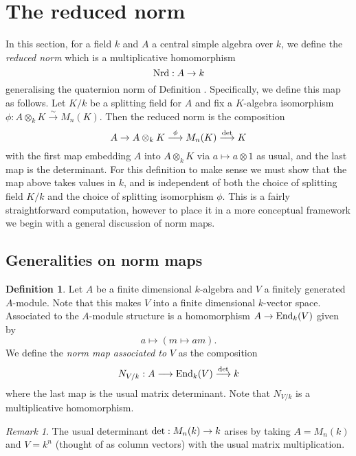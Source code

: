 \documentclass[11pt]{amsart}
\numberwithin{equation}{section}
\theoremstyle{remark}
\newtheorem{remark}[equation]{Remark}
\theoremstyle{remark}
\theoremstyle{remark}
\theoremstyle{definition}
\theoremstyle{definition}
\theoremstyle{definition}
\newtheorem{defi}[equation]{Definition}
\theoremstyle{definition}
\theoremstyle{definition}
\theoremstyle{definition}
\begin{document}
\section{The reduced norm}

In this section, for a field $k$ and $A$ a central simple algebra over $k$, we define the \textit{reduced norm} which is a multiplicative homomorphism
\[\textup{Nrd}:A\rightarrow k\]
generalising the quaternion norm of Definition . Specifically, we define this map as follows. Let $K/k$ be a splitting field for $A$ and fix a $K$-algebra isomorphism
$\phi:A\otimes_k K \stackrel{\sim}{\longrightarrow}M_n(K).$
Then the reduced norm is the composition 
\[A\rightarrow A\otimes_kK \stackrel{\phi}{\longrightarrow}M_n(K)\stackrel{\textup{det}}{\longrightarrow}K\]
with the first map embedding $A$ into $A\otimes_k K$ via $a\mapsto a\otimes 1$ as usual, and the last map is the determinant. For this definition to make sense we must show that the map above takes values in $k$, and is independent of both the choice of splitting field $K/k$ and the choice of splitting isomorphism $\phi$. This is a fairly straightforward computation, however to place it in a more conceptual framework we begin with a general discussion of norm maps. 

\subsection{Generalities on norm maps}

\begin{defi}
Let $A$ be a finite dimensional $k$-algebra and $V$ a finitely generated $A$-module. Note that this makes $V$ into a finite dimensional $k$-vector space. Associated to the $A$-module structure is a homomorphism $A\rightarrow \textup{End}_k(V)$ given by
\[a\mapsto (m\mapsto am).\]
We define the \textit{norm map associated to} $V$ as the composition
\[N_{V/k}:A\longrightarrow \textup{End}_k(V)\stackrel{\textup{det}}{\longrightarrow}k\]
where the last map is the usual matrix determinant. Note that $N_{V/k}$ is a multiplicative homomorphism. 
\end{defi}

\begin{remark} \label{usual determinant}
The usual determinant $\textup{det}:M_n(k)\rightarrow k$ arises by taking $A=M_n(k)$ and $V=k^n$ (thought of as column vectors) with the usual matrix multiplication. 
\end{remark}
\end{document}
